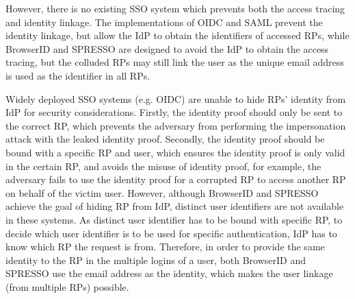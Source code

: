 

However, there is no existing SSO system which prevents both the access tracing and identity linkage. The implementations of OIDC and SAML prevent the identity linkage, but allow the IdP to obtain the identifiers of accessed RPs, while BrowserID and SPRESSO are designed to avoid the IdP to obtain the access tracing, but the colluded RPs may still link the user as the unique email address is used as the identifier in all RPs.


Widely deployed SSO systems (e.g. OIDC) are unable to hide RPs' identity from IdP for security considerations. Firstly, the identity proof should only be sent to the correct RP, which prevents the adversary from performing the impersonation attack with the leaked identity proof. Secondly, the identity proof should be bound with a specific RP and user, which ensures the identity proof is only valid in the certain RP, and avoids the misuse of identity proof, for example, the adversary fails to  use the identity proof for a corrupted RP to access another RP on behalf of the victim user. However, although BrowserID and SPRESSO achieve the goal of hiding RP from IdP, distinct user identifiers are not available in these systems. As distinct user identifier has to be bound with specific RP, to decide which user identifier is to be used for specific authentication, IdP has to know which RP the request is from. Therefore, in order to provide the same identity to the RP in the multiple logins of a user, both BrowserID and SPRESSO use the email address as the identity, which makes the user linkage (from multiple RPs) possible.


